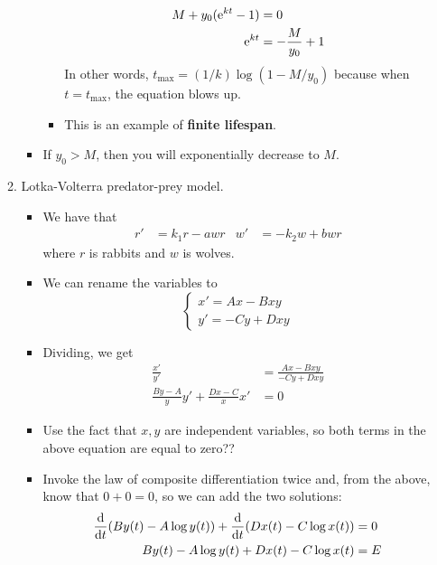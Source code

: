 \documentclass[../notes.tex]{subfiles}
\begin{document}
\begin{itemize}
\begin{enumerate}
\begin{itemize}
\begin{itemize}
                \begin{align*}
                    M+y_0(\e[kt]-1) &= 0\\
                    \e[kt] &= -\frac{M}{y_0}+1
                \end{align*}
                In other words, $t_\text{max}=(1/k)\log(1-M/y_0)$ because when $t=t_\text{max}$, the equation blows up.
                \item This is an example of \textbf{finite lifespan}.
            \end{itemize}
            \item If $y_0>M$, then you will exponentially decrease to $M$.
        \end{itemize}
        \item Lotka-Volterra predator-prey model.
        \begin{itemize}
            \item We have that
            \begin{align*}
                r' &= k_1r-awr&
                w' &= -k_2w+bwr
            \end{align*}
            where $r$ is rabbits and $w$ is wolves.
            \item We can rename the variables to
            \begin{equation*}
                \begin{cases}
                    x' = Ax-Bxy\\
                    y' = -Cy+Dxy
                \end{cases}
            \end{equation*}
            \item Dividing, we get
            \begin{align*}
                \frac{x'}{y'} &= \frac{Ax-Bxy}{-Cy+Dxy}\\
                \frac{By-A}{y}y'+\frac{Dx-C}{x}x' &= 0
            \end{align*}
            \item Use the fact that $x,y$ are independent variables, so both terms in the above equation are equal to zero??
            \item Invoke the law of composite differentiation twice and, from the above, know that $0+0=0$, so we can add the two solutions:
            \begin{align*}
                \dv{t}(By(t)-A\log y(t))+\dv{t}(Dx(t)-C\log x(t)) &= 0\\
                By(t)-A\log y(t)+Dx(t)-C\log x(t) &= E

\end{align*}
\end{itemize}
\end{enumerate}
\end{itemize}
\end{document}
